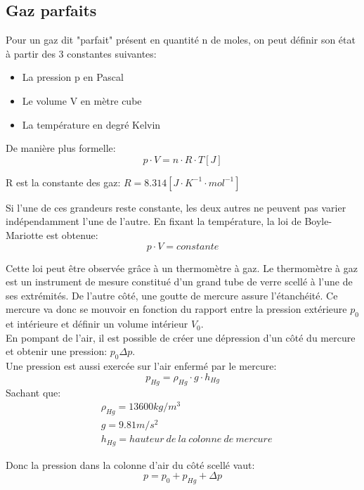 \subsection{Gaz parfaits}
Pour un gaz dit "parfait" présent en quantité n de moles, on peut définir son état à partir des 3 constantes suivantes:
\begin{itemize}
    \item{La pression p en Pascal}
    \item{Le volume V en mètre cube}
    \item{La température en degré Kelvin}
\end{itemize}

De manière plus formelle:
\begin{equation}
    \label{gazparf}
    p \cdot V = n\cdot R \cdot T [J]
\end{equation}

R est la constante des gaz: $R=8.314 [J\cdot K^{-1} \cdot mol^{-1}]$

Si l'une de ces grandeurs reste constante, les deux autres ne peuvent pas varier indépendamment l'une de l'autre. En fixant la température, la loi de Boyle-Mariotte est obtenue:
\begin{equation}
    \label{boylemariotte}
    p\cdot V = constante
\end{equation}

Cette loi peut être observée grâce à un thermomètre à gaz.
Le thermomètre à gaz est un instrument de mesure constitué d'un grand tube de verre scellé à l'une de ses extrémités. De l'autre côté, une goutte de mercure assure l'étanchéité. Ce mercure va donc se mouvoir en fonction du rapport entre la pression extérieure $p_0$ et intérieure et définir un volume intérieur $V_0$.\\
En pompant de l'air, il est possible de créer une dépression d'un côté du mercure et obtenir une pression: $p_0 \Delta p$.\\
Une pression est aussi exercée sur l'air enfermé par le mercure:
\begin{equation}
    p_{Hg} = \rho_{Hg}\cdot g \cdot h_{Hg}
\end{equation}
Sachant que:
\begin{align*}
    &\rho_{Hg} = 13600 kg/m^3\\
    &g = 9.81 m/s^2\\
    &h_{Hg} = hauteur\ de\ la\ colonne\ de\ mercure
\end{align*}

Donc la pression dans la colonne d'air du côté scellé vaut:
\begin{equation}
    \label{pression}
    p = p_0 + p_{Hg} + \Delta p
\end{equation}

